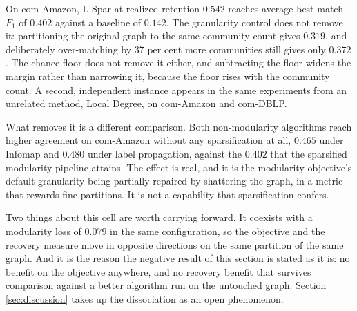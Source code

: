 On com-Amazon, L-Spar at realized retention $0.542$
reaches average best-match $F_1$ of $0.402$ against a baseline of $0.142$. The
granularity control does not remove it: partitioning the original graph to the
same community count gives $0.319$, and deliberately over-matching by 37 per cent
more communities still gives only $0.372$. The chance floor does not remove it
either, and subtracting the floor widens the margin rather than narrowing it,
because the floor rises with the community count. A second, independent instance
appears in the same experiments from an unrelated method, Local Degree, on
com-Amazon and com-DBLP.

What removes it is a different comparison. Both non-modularity algorithms reach
higher agreement on com-Amazon without any sparsification at all, $0.465$ under
Infomap and $0.480$ under label propagation, against the $0.402$ that the
sparsified modularity pipeline attains. The effect is real, and it is the
modularity objective's default granularity being partially repaired by shattering
the graph, in a metric that rewards fine partitions. It is not a capability that
sparsification confers.

Two things about this cell are worth carrying forward. It coexists with a
modularity loss of $0.079$ in the same configuration, so the objective and the
recovery measure move in opposite directions on the same partition of the same
graph. And it is the reason the negative result of this section is stated as it
is: no benefit on the objective anywhere, and no recovery benefit that survives
comparison against a better algorithm run on the untouched graph. Section
\ref{sec:discussion} takes up the dissociation as an open phenomenon.
